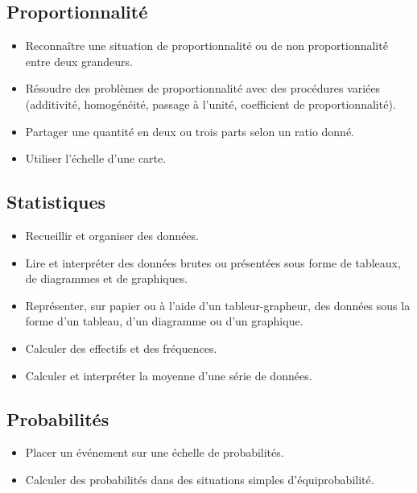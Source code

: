 \documentclass[a4paper,12pt,fleqn]{article}	
\begin{document}
\renewcommand{\labelitemi}{}

\subsection*{Proportionnalité}

\begin{itemize}
	\item {}Reconnaître une situation de proportionnalité ou de non proportionnalité́ entre deux grandeurs.
	\item {}Résoudre des problèmes de proportionnalité avec des procédures variées (additivité, homogénéité, passage à l’unité, coefficient de proportionnalité).
	\item {}Partager une quantité en deux ou trois parts selon un ratio donné.
	\item {}Utiliser l’échelle d’une carte.
\end{itemize}

\subsection*{Statistiques}

\begin{itemize}
	\item {}Recueillir et organiser des données.
	\item {}Lire et interpréter des données brutes ou présentées sous forme de tableaux, de diagrammes et de graphiques.
	\item {}Représenter, sur papier ou à l’aide d’un tableur-grapheur, des données sous la forme d’un tableau, d’un diagramme ou d’un graphique.
	\item {}Calculer des effectifs et des fréquences.
	\item {}Calculer et interpréter la moyenne d’une série de données.
\end{itemize}

\subsection*{Probabilités}

\begin{itemize}
	\item {}Placer un événement sur une échelle de probabilités.
	\item {}Calculer des probabilités dans des situations simples d’équiprobabilité.
\end{itemize}

	
\end{document}
